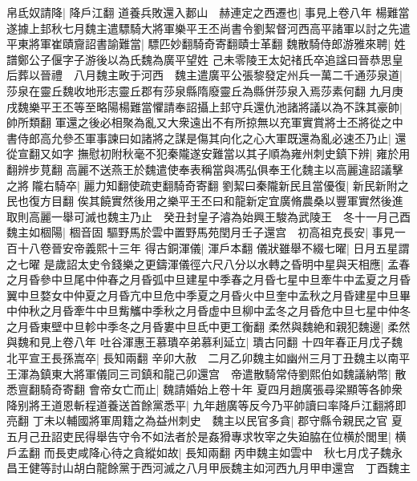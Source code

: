 帛氐奴請降|{
	降戶江翻}
道養兵敗還入郪山　赫連定之西遷也|{
	事見上卷八年}
楊難當遂據上邽秋七月魏主遣驃騎大將軍樂平王丕尚書令劉絜督河西高平諸軍以討之先遣平東將軍崔賾齎詔書諭難當|{
	驃匹妙翻騎奇寄翻賾士革翻}
魏散騎侍郎游雅來聘|{
	姓譜鄭公子偃字子游後以為氏魏為廣平望姓}
己未零陵王太妃禇氏卒追諡曰晉恭思皇后葬以晉禮　八月魏主畋于河西　魏主遣廣平公張黎發定州兵一萬二千通莎泉道|{
	莎泉在靈丘魏收地形志靈丘郡有莎泉縣隋廢靈丘為縣併莎泉入焉莎素何翻}
九月庚戌魏樂平王丕等至略陽楊難當懼請奉詔攝上邽守兵還仇池諸將議以為不誅其豪帥|{
	帥所類翻}
軍還之後必相聚為亂又大衆遠出不有所掠無以充軍實賞將士丕將從之中書侍郎高允參丕軍事諫曰如諸將之謀是傷其向化之心大軍既還為亂必速丕乃止|{
	還從宣翻又如字}
撫慰初附秋毫不犯秦隴遂安難當以其子順為雍州刺史鎮下辨|{
	雍於用翻辨步莧翻}
高麗不送燕王於魏遣使奉表稱當與馮弘俱奉王化魏主以高麗違詔議擊之將隴右騎卒|{
	麗力知翻使疏吏翻騎奇寄翻}
劉絜曰秦隴新民且當優復|{
	新民新附之民也復方目翻}
俟其饒實然後用之樂平王丕曰和龍新定宜廣脩農桑以豐軍實然後進取則高麗一舉可滅也魏主乃止　癸丑封皇子濬為始興王駿為武陵王　冬十一月己酉魏主如棝陽|{
	棝音固}
驅野馬於雲中置野馬苑閏月壬子還宫　初高祖克長安|{
	事見一百十八卷晉安帝義熙十三年}
得古銅渾儀|{
	渾戶本翻}
儀狀雖舉不綴七曜|{
	日月五星謂之七曜}
是歲詔太史令錢樂之更鑄渾儀徑六尺八分以水轉之昏明中星與天相應|{
	孟春之月昏參中旦尾中仲春之月昏弧中旦建星中季春之月昏七星中旦牽牛中孟夏之月昏翼中旦婺女中仲夏之月昏亢中旦危中季夏之月昏火中旦奎中孟秋之月昏建星中旦畢中仲秋之月昏牽牛中旦觜觿中季秋之月昏虚中旦柳中孟冬之月昏危中旦七星中仲冬之月昏東壁中旦軫中季冬之月昏婁中旦氐中更工衡翻}
柔然與魏絶和親犯魏邊|{
	柔然與魏和見上卷八年}
吐谷渾惠王慕璝卒弟慕利延立|{
	璝古冋翻}
十四年春正月戊子魏北平宣王長孫嵩卒|{
	長知兩翻}
辛卯大赦　二月乙卯魏主如幽州三月丁丑魏主以南平王渾為鎮東大將軍儀同三司鎮和龍己卯還宫　帝遣散騎常侍劉熙伯如魏議納幣|{
	散悉亶翻騎奇寄翻}
會帝女亡而止|{
	魏請婚始上卷十年}
夏四月趙廣張尋梁顯等各帥衆降别將王道恩斬程道養送首餘黨悉平|{
	九年趙廣等反今乃平帥讀曰率降戶江翻將即亮翻}
丁未以輔國將軍周籍之為益州刺史　魏主以民官多貪|{
	郡守縣令親民之官}
夏五月己丑詔吏民得舉告守令不如法者於是姦猾專求牧宰之失廹脇在位横於閭里|{
	横戶孟翻}
而長吏咸降心待之貪縱如故|{
	長知兩翻}
丙申魏主如雲中　秋七月戊子魏永昌王健等討山胡白龍餘黨于西河滅之八月甲辰魏主如河西九月甲申還宫　丁酉魏主

